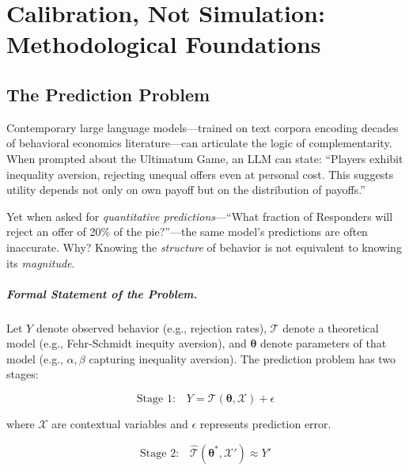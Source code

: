 \documentclass[12pt,oneside]{book}
\begin{document}
\chapter{Calibration, Not Simulation: Methodological Foundations}
\label{sec:calibration}


\section{The Prediction Problem}

Contemporary large language models—trained on text corpora encoding decades of behavioral
economics literature—can articulate the logic of complementarity. When prompted about the
Ultimatum Game, an LLM can state: ``Players exhibit inequality aversion, rejecting unequal
offers even at personal cost. This suggests utility depends not only on own payoff but on
the distribution of payoffs.''

Yet when asked for \emph{quantitative predictions}—``What fraction of Responders will reject
an offer of 20\% of the pie?''—the same model's predictions are often inaccurate. Why?
Knowing the \emph{structure} of behavior is not equivalent to knowing its \emph{magnitude}.

\paragraph{Formal Statement of the Problem.}

Let $Y$ denote observed behavior (e.g., rejection rates), $\mathcal{T}$ denote a theoretical model
(e.g., Fehr-Schmidt inequity aversion), and $\boldsymbol{\theta}$ denote parameters of that model
(e.g., $\alpha, \beta$ capturing inequality aversion). The prediction problem has two stages:

\begin{equation}
\text{Stage 1:} \quad Y = \mathcal{T}(\boldsymbol{\theta}, \mathcal{X}) + \epsilon
\label{eq:prediction-stage-1}
\end{equation}

where $\mathcal{X}$ are contextual variables and $\epsilon$ represents prediction error.

\begin{equation}
\text{Stage 2:} \quad \hat{\mathcal{T}}(\boldsymbol{\theta}^*, \mathcal{X}') \approx Y'
\label{eq:prediction-stage-2}
\end{equation}
\end{document}

